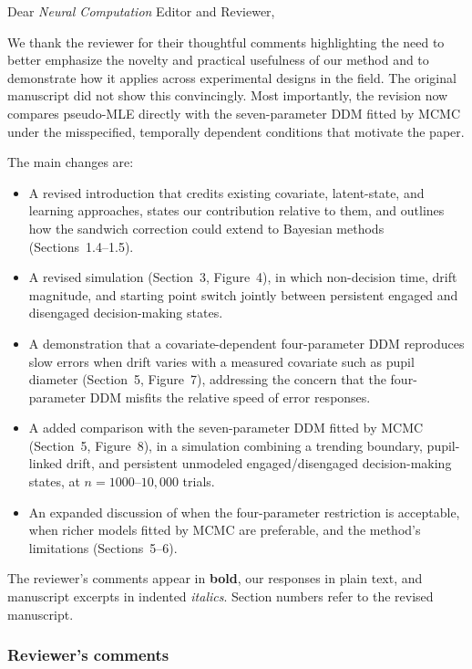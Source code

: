 \documentclass[00-main.tex]{subfiles}
\begin{document}
Dear \emph{Neural Computation} Editor and Reviewer,

\vspace{0.5cm}

We thank the reviewer for their thoughtful comments highlighting the need to better emphasize the novelty and practical usefulness of our method and to demonstrate how it applies across experimental designs in the field. The original manuscript did not show this convincingly. Most importantly, the revision now compares pseudo-MLE directly with the seven-parameter DDM fitted by MCMC under the misspecified, temporally dependent conditions that motivate the paper.

The main changes are:
\begin{itemize}
    \item A revised introduction that credits existing covariate, latent-state, and learning approaches, states our contribution relative to them, and outlines how the sandwich correction could extend to Bayesian methods (Sections~1.4--1.5).
    \item A revised simulation (Section~3, Figure~4), in which non-decision time, drift magnitude, and starting point switch jointly between persistent engaged and disengaged decision-making states.
    \item A demonstration that a covariate-dependent four-parameter DDM reproduces slow errors when drift varies with a measured covariate such as pupil diameter (Section~5, Figure~7), addressing the concern that the four-parameter DDM misfits the relative speed of error responses.
    \item A added comparison with the seven-parameter DDM fitted by MCMC (Section~5, Figure~8), in a simulation combining a trending boundary, pupil-linked drift, and persistent unmodeled engaged/disengaged decision-making states, at $n=1000$--$10{,}000$ trials.
    \item An expanded discussion of when the four-parameter restriction is acceptable, when richer models fitted by MCMC are preferable, and the method's limitations (Sections~5--6).
\end{itemize}

The reviewer's comments appear in \textbf{bold}, our responses in plain text, and manuscript excerpts in indented \textit{italics}. Section numbers refer to the revised manuscript.

\subsubsection*{Reviewer's comments}
\end{document}
